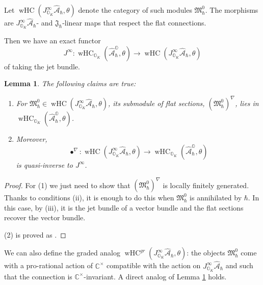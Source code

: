 \documentclass[12pt]{amsart}
\newcommand{\C}{\mathbb{C}}
\newcommand{\A}{\mathcal{A}}
\newcommand{\Orb}{\mathbb{O}}
\newcommand{\jet}{J^\infty}
\newcommand{\wHC}{\operatorname{wHC}}
\newtheorem{Lem}[Thm]{Lemma}
\theoremstyle{definition}
\numberwithin{equation}{section}
\begin{document}
Let $\wHC(\jet_{\Orb_K} \hat{\A}_\hbar,\theta)$ denote the category
of such modules $\mathfrak{M}^0_\hbar$. The morphisms are $\jet_{\Orb_K} \hat{\A}_\hbar$-
and $\mathfrak{J}_\hbar$-linear maps that respect the flat connections.

Then we have an exact functor
$$\jet: \wHC_{\Orb_K}(\hat{\A}_\hbar^{\Orb},\theta) \to \wHC(\jet_{\Orb_K} \hat{\A}_\hbar,\theta)$$
of taking the jet bundle.

\begin{Lem}\label{Lem:HC_jet}
The following claims are true:
\begin{enumerate}
\item
For $\mathfrak{M}^0_\hbar\in \wHC(\jet_{\Orb_K} \hat{\A}_\hbar,\theta)$, its submodule of flat sections, $(\mathfrak{M}^0_\hbar)^\nabla$, lies in
$\wHC_{\Orb_K}(\hat{\A}_\hbar^{\Orb},\theta)$.
\item  Moreover,
$$\bullet^\nabla: \wHC(\jet_{\Orb_K} \hat{\A}_\hbar,\theta)\rightarrow
\wHC_{\Orb_K}(\hat{\A}_\hbar^{\Orb},\theta) $$ is quasi-inverse to $\jet$.
\end{enumerate}
\end{Lem}
\begin{proof}
For (1) we just need to show that $(\mathfrak{M}^0_\hbar)^\nabla$ is locally finitely
generated. Thanks to conditions (ii), it is enough to do this when
$\mathfrak{M}^0_\hbar$ is annihilated by $\hbar$. In this case, by (iii), it is the jet bundle of a vector
bundle and the flat sections recover the vector bundle.

(2) is proved as \cite[Lemma 2.16]{HC_symp}.
\end{proof}

%

We can also define the graded analog $\wHC^{gr}(\jet_{\Orb_K} \hat{\A}_\hbar,\theta)$:
the objects $\mathfrak{M}^0_\hbar$ come with a pro-rational action of $\C^\times$ compatible
with the action on $\jet_{\Orb_K} \hat{\A}_\hbar$ and such that the connection is
$\C^\times$-invariant. A direct analog of Lemma \ref{Lem:HC_jet} holds.
\end{document}
